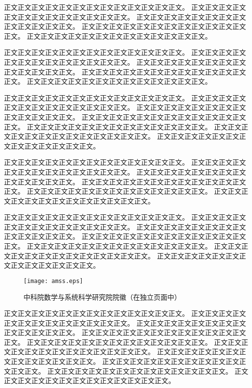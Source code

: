 正文正文正文正文正文正文正文正文正文正文正文正文正文。
正文正文正文正文正文正文正文正文正文正文正文正文正文。
正文正文正文正文正文正文正文正文正文正文正文正文正文。
正文正文正文正文正文正文正文正文正文正文正文正文正文。
正文正文正文正文正文正文正文正文正文正文正文正文正文。

正文正文正文正文正文正文正文正文正文正文正文正文正文。
正文正文正文正文正文正文正文正文正文正文正文正文正文。
正文正文正文正文正文正文正文正文正文正文正文正文正文。
正文正文正文正文正文正文正文正文正文正文正文正文正文。
正文正文正文正文正文正文正文正文正文正文正文正文正文。

正文正文正文正文正文正文正文正文正文正文正文正文正文。
正文正文正文正文正文正文正文正文正文正文正文正文正文。
正文正文正文正文正文正文正文正文正文正文正文正文正文。
正文正文正文正文正文正文正文正文正文正文正文正文正文。
正文正文正文正文正文正文正文正文正文正文正文正文正文。
正文正文正文正文正文正文正文正文正文正文正文正文正文。
正文正文正文正文正文正文正文正文正文正文正文正文正文。

正文正文正文正文正文正文正文正文正文正文正文正文正文。
正文正文正文正文正文正文正文正文正文正文正文正文正文。
正文正文正文正文正文正文正文正文正文正文正文正文正文。
正文正文正文正文正文正文正文正文正文正文正文正文正文。
正文正文正文正文正文正文正文正文正文正文正文正文正文。
正文正文正文正文正文正文正文正文正文正文正文正文正文。

正文正文正文正文正文正文正文正文正文正文正文正文正文。
正文正文正文正文正文正文正文正文正文正文正文正文正文。
正文正文正文正文正文正文正文正文正文正文正文正文正文。
正文正文正文正文正文正文正文正文正文正文正文正文正文。
正文正文正文正文正文正文正文正文正文正文正文正文正文。
正文正文正文正文正文正文正文正文正文正文正文正文正文。
正文正文正文正文正文正文正文正文正文正文正文正文正文。

\begin{figure}[p]
 \centering
 \texttt{[image: amss.eps]}
 \caption{中科院数学与系统科学研究院院徽（在独立页面中）}
 \label{fig:amss1}
\end{figure}

正文正文正文正文正文正文正文正文正文正文正文正文正文。
正文正文正文正文正文正文正文正文正文正文正文正文正文。
正文正文正文正文正文正文正文正文正文正文正文正文正文。
正文正文正文正文正文正文正文正文正文正文正文正文正文。
正文正文正文正文正文正文正文正文正文正文正文正文正文。
正文正文正文正文正文正文正文正文正文正文正文正文正文。
正文正文正文正文正文正文正文正文正文正文正文正文正文。
正文正文正文正文正文正文正文正文正文正文正文正文正文。
正文正文正文正文正文正文正文正文正文正文正文正文正文。
正文正文正文正文正文正文正文正文正文正文正文正文正文。
